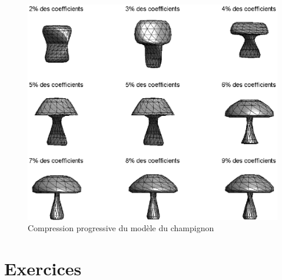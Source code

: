 \begin{figure}[ht] 
    \begin{center}
    \includegraphics[scale=0.6]{images/graph-compression-progression.eps}
    \end{center}
    \caption{Compression progressive du modèle du champignon}
	 \label{fig-graph-compression-progression}
\end{figure}

\section{Exercices}
\label{sect1-chap2-exercices} 


